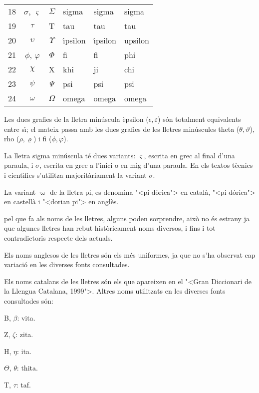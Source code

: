 \begin{table}[h]
\begin{center}
\begin{tabular}{ccclll}
   18 & $\sigma$, $\varsigma$ & $\Sigma$ & sigma & sigma &  sigma\\
   19 & $\tau$ & T & tau & tau & tau\\
   20 & $\upsilon$ & $\Upsilon$ & \'{\i}psilon & \'{\i}psilon &  upsilon\\
   21 & $\phi$, $\varphi$ & $\Phi$ & fi & fi &  phi\\
   22 & $\chi$ & X & khi & ji &  chi\\
   23 & $\psi$ & $\Psi$ & psi & psi &  psi\\
   24 & $\omega$ & $\Omega$ & omega & omega &  omega\\
   \bottomrule[1pt]
   \end{tabular} \end{center}
\end{table}

Les dues grafies de la lletra min\'{u}scula \`{e}psilon  ($\epsilon,
\varepsilon$) s\'{o}n totalment equivalents entre s\'{\i}; el mateix passa
amb les dues grafies de les lletres min\'{u}scules theta ($\theta,
\vartheta$), rho ($\rho,\varrho$) i fi ($\phi, \varphi$).

La lletra sigma min\'{u}scula t\'{e} dues variants: $\varsigma$, escrita en
grec al final d'una paraula, i $\sigma$, escrita en grec a l'inici o
en mig d'una paraula. En els textos t\`{e}cnics i cient\'{\i}fics s'utilitza
majorit\`{a}riament la variant $\sigma$.

La variant $\varpi$ de la lletra pi, es denomina {"<}pi d\`{o}rica{">} en
catal\`{a}, {"<}pi d\'{o}rica{">} en castell\`{a} i {"<}dorian pi{">} en angl\`{e}s.

pel que fa als noms de les lletres, alguns poden sorprendre, aix\`{o} no
\'{e}s estrany ja que algunes lletres han rebut hist\`{o}ricament noms
diversos, i fins i tot contradictoris respecte dels actuals.

Els noms anglesos de les lletres s\'{o}n els m\'{e}s uniformes, ja que no
s'ha observat cap variaci\'{o} en les diverses fonts consultades.

Els noms catalans de les lletres s\'{o}n els que apareixen en el {"<}Gran
Diccionari de la Llengua Catalana, 1999{">}. Altres noms utilitzats en
les diverses fonts consultades s\'{o}n:
\begin{multicols}{3}
\begin{list}{}
   {\setlength{\labelwidth}{16mm} \setlength{\leftmargin}{16mm} \setlength{\labelsep}{2mm}}
   \item[B, $\beta$:] vita.
   \item[Z, $\zeta$:] zita.
   \item[H, $\eta$:] ita.
   \item[$\Theta$, $\theta$:] thita.
   \item[T, $\tau$:] taf.
\end{list}
\end{multicols}

